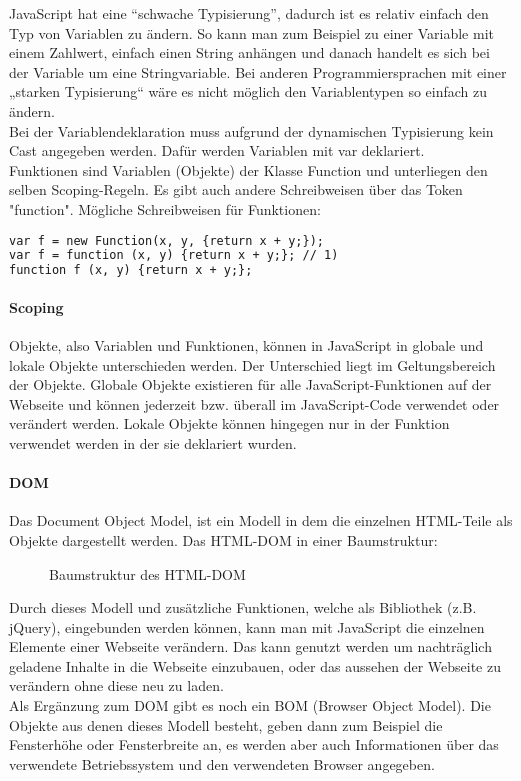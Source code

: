JavaScript hat eine \enquote{schwache Typisierung}, dadurch ist es relativ einfach den Typ von Variablen zu ändern. So kann man zum Beispiel zu einer Variable mit einem  Zahlwert, einfach einen String anhängen und danach handelt es sich bei der Variable um eine Stringvariable. Bei anderen Programmiersprachen mit einer „starken Typisierung“ wäre es nicht möglich den Variablentypen so einfach zu ändern.\\
 Bei der Variablendeklaration muss aufgrund der dynamischen Typisierung kein Cast angegeben werden. Dafür werden Variablen mit var deklariert.\\
Funktionen sind Variablen (Objekte) der Klasse Function und unterliegen den selben Scoping-Regeln. Es gibt auch andere Schreibweisen über das Token "function". Mögliche Schreibweisen für Funktionen:\\
\begin{lstlisting}[language=html]
var f = new Function(x, y, {return x + y;});
var f = function (x, y) {return x + y;}; // 1)
function f (x, y) {return x + y;};
\end{lstlisting}

\paragraph{Scoping}
Objekte, also Variablen und Funktionen, können in JavaScript in globale und lokale Objekte unterschieden werden. Der Unterschied liegt im Geltungsbereich der Objekte. Globale Objekte existieren für alle JavaScript-Funktionen auf der Webseite und können jederzeit bzw. überall im JavaScript-Code verwendet oder verändert werden. Lokale Objekte können hingegen nur in der Funktion verwendet werden in der sie deklariert wurden.\\
\paragraph{DOM}
Das Document Object Model, ist ein Modell in dem die einzelnen HTML-Teile als Objekte dargestellt werden.
Das HTML-DOM in einer Baumstruktur:\\

\begin{figure}[H]
\caption{Baumstruktur des HTML-DOM}
\end{figure}

Durch dieses Modell und zusätzliche Funktionen, welche als Bibliothek (z.B. jQuery), eingebunden werden können, kann man mit JavaScript die einzelnen Elemente einer Webseite verändern. Das kann genutzt werden um nachträglich geladene Inhalte in die Webseite einzubauen, oder das aussehen der Webseite zu verändern ohne diese neu zu laden.\\
Als Ergänzung zum DOM gibt es noch ein BOM (Browser Object Model). Die Objekte aus denen dieses Modell besteht, geben dann zum Beispiel die Fensterhöhe oder Fensterbreite an, es werden aber auch Informationen über das verwendete Betriebssystem und den verwendeten Browser angegeben.

